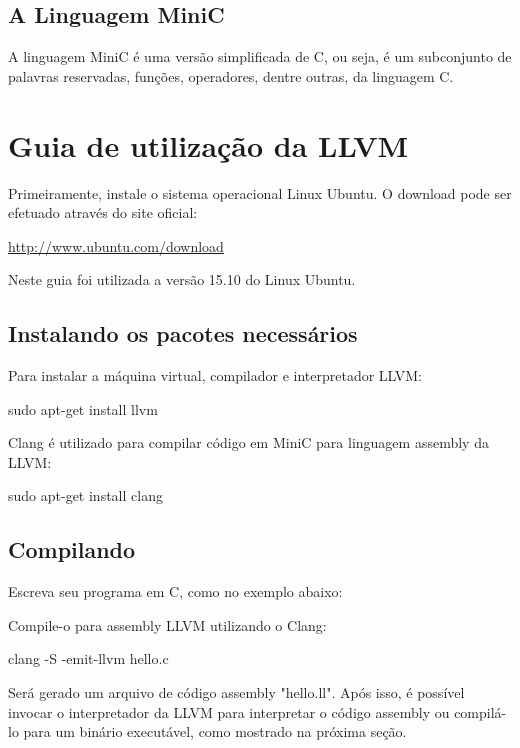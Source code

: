 \documentclass[12pt,a4paper,twoside]{report}
\begin{document}
\section{A Linguagem MiniC}
A linguagem MiniC é uma versão simplificada de C, ou seja, é um subconjunto de palavras reservadas, funções, operadores, dentre outras, da linguagem C.

\chapter{Guia de utilização da LLVM}

Primeiramente, instale o sistema operacional Linux Ubuntu. O download pode ser efetuado através do site oficial:

\url{http://www.ubuntu.com/download}

Neste guia foi utilizada a versão 15.10 do Linux Ubuntu.

\section{Instalando os pacotes necessários}
Para instalar a máquina virtual, compilador e interpretador LLVM:
\begin{terminal}
sudo apt-get install llvm
\end{terminal}

Clang é utilizado para compilar código em MiniC para linguagem assembly da LLVM:
\begin{terminal}
sudo apt-get install clang
\end{terminal}

\section{Compilando}
Escreva seu programa em C, como no exemplo abaixo:



Compile-o para assembly LLVM utilizando o Clang:

\begin{terminal}
clang -S -emit-llvm hello.c
\end{terminal}

Será gerado um arquivo de código assembly "hello.ll". Após isso, é possível invocar o interpretador da LLVM para interpretar o código assembly ou compilá-lo para um binário executável, como mostrado na próxima seção. 


\end{document}
